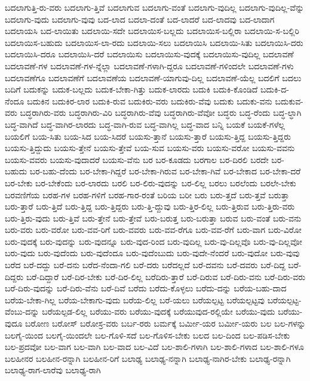 {ಬದಲಾಗುತ್ತಿ-ರು-ವರು
ಬದಲಾಗು-ತ್ತಿವೆ
ಬದಲಾಗುವ
ಬದಲಾಗು-ವಂತೆ
ಬದಲಾಗು-ವುದಿಲ್ಲ
ಬದಲಾಗು-ವುದಿಲ್ಲ-ವೆನ್ನು
ಬದಲಾಗು-ವುದು
ಬದಲಾಗು-ವುವು
ಬದ-ಲಾದ
ಬದಲಾ-ದಂತೆ
ಬದ-ಲಾದರೆ
ಬದ-ಲಾದವು
ಬದ-ಲಾದಾಗ
ಬದಲಾಯಸಿ
ಬದ-ಲಾಯಿತು
ಬದಲಾಯಿ-ಸದೇ
ಬದಲಾಯಿಸ-ಬಲ್ಲದು
ಬದಲಾಯಿಸ-ಬಲ್ಲಿರಾ
ಬದಲಾಯಿ-ಸ-ಬಲ್ಲಿರಿ
ಬದಲಾಯಿಸ-ಬಹುದು
ಬದಲಾಯಿಸ-ಲಾ-ರದು
ಬದಲಾಯಿ-ಸಲು
ಬದಲಾಯಿಸಿ
ಬದಲಾಯಿ-ಸಿತು
ಬದಲಾಯಿಸಿ-ದರು
ಬದಲಾಯಿಸಿ-ದರೂ
ಬದಲಾಯಿಸಿ-ದರೆ
ಬದಲಾಯಿಸು
ಬದಲಾಯಿಸು-ವುದಕ್ಕೆ
ಬದಲಾಯಿಸು-ವುದಿಲ್ಲ
ಬದಲಾವಣೆ
ಬದಲಾವಣೆ-ಗಳ
ಬದಲಾವಣೆ-ಗಳ-ನ್ನೆಲ್ಲಾ
ಬದಲಾವಣೆ-ಗಳಾಗಿ-ದ್ದರೂ
ಬದಲಾವಣೆ-ಗಳಿಂದಲೇ
ಬದಲಾವಣೆ-ಗಳು
ಬದಲಾವಣೆಗೂ
ಬದಲಾವಣೆಗೆ
ಬದಲಾವಣೆಯ
ಬದಲಾವಣೆ-ಯಾಗುವು-ದಿಲ್ಲ
ಬದಲಾವಣೆ-ಯೆಲ್ಲ
ಬದಲಿಗೆ
ಬದಲು
ಬದಿಗೆ
ಬದುಕನ್ನು
ಬದುಕ-ಬಲ್ಲದು
ಬದುಕ-ಬೇಕಾ-ಗಿತ್ತು
ಬದುಕ-ಲಾರದು
ಬದುಕಿ
ಬದುಕಿ-ಕೊಂಡಿದೆ
ಬದುಕಿ-ದ-ನೆಂದೂ
ಬದುಕಿನ
ಬದುಕಿರ-ಲಾರ
ಬದುಕಿ-ರುವ
ಬದುಕಿರು-ವರು
ಬದುಕಿರು-ವೆವು
ಬದುಕು
ಬದುಕು-ವನು
ಬದುಕುವ-ವರು
ಬದ್ಧರಾಗಿರು-ವರು
ಬದ್ಧರಾಗಿರು-ವಿರಿ
ಬದ್ಧರಾಗಿರು-ವೆವು
ಬದ್ಧರಾಗಿರು-ವೆವೋ
ಬದ್ಧರು
ಬದ್ಧ-ರೆಂದು
ಬದ್ಧ-ಲ್ಧಾಗಿ
ಬದ್ಧ-ವಾಗಿದೆ
ಬದ್ಧ-ವಾಗಿರ-ಲಾರದು
ಬದ್ಧ-ವಾಗಿ-ರುವ
ಬದ್ಧ-ವಾಗಿಲ್ಲ
ಬದ್ಧ-ವಾದ
ಬನ್ನಿ
ಬಯಕೆ
ಬಯಕೆ-ಗಳೆಲ್ಲ
ಬಯಲಿಗೆ
ಬಯ-ಸಿತು
ಬಯ-ಸಿದ
ಬಯ-ಸಿದರೆ
ಬಯಸು-ತ್ತಾನೆ
ಬಯಸು-ತ್ತಾರೆ
ಬಯಸು-ತ್ತಿದ್ದ
ಬಯಸು-ತ್ತಿದ್ದರು
ಬಯಸು-ತ್ತಿದ್ದುದು
ಬಯಸು-ತ್ತೇನೆ
ಬಯಸು-ತ್ತೇವೆ
ಬಯ-ಸುವ
ಬಯಸು-ವರು
ಬಯಸು-ವರೋ
ಬಯಸು-ವವನು
ಬಯಸು-ವವರು
ಬಯಸು-ವುದಾದರೆ
ಬಯಸು-ವೆನು
ಬರ
ಬರ-ಕೂಡದು
ಬರಗಾಲ
ಬರ-ದಿರಲಿ
ಬರದೇ
ಬರ-ಬಹುದು
ಬರ-ಬಹು-ದೆಂದು
ಬರ-ಬೇಕಾ-ಗಿದ್ದರೆ
ಬರ-ಬೇಕಾ-ಗಿರುವ
ಬರ-ಬೇಕಾ-ಗಿವೆ
ಬರ-ಬೇಕಾದ
ಬರ-ಬೇಕಾ-ದರೆ
ಬರ-ಬೇಕು
ಬರ-ಬೇಕೆಂದು
ಬರ-ಲಾರದು
ಬರಲಿ
ಬರ-ಲಿರು-ವುದನ್ನು
ಬರ-ಲಿಲ್ಲ
ಬರಲು
ಬರಲೆಂದು
ಬರಲೇ-ಬೇಕು
ಬರವಣಿಗೆಯ
ಬರಹ-ಗಳ
ಬರಹ-ಗಳಿಗೆ
ಬರಹ-ಗಾರ-ರಂತೆ
ಬರಿಯ
ಬರೀ
ಬರು
ಬರು-ತ್ತದೆ
ಬರು-ತ್ತವೆ
ಬರುತ್ತಾ
ಬರು-ತ್ತಾರೆ
ಬರು-ತ್ತಿದೆ
ಬರು-ತ್ತಿದ್ದ
ಬರು-ತ್ತಿದ್ದರು
ಬರು-ತ್ತಿ-ದ್ದುವು
ಬರು-ತ್ತಿರ-ಲಿಲ್ಲ
ಬರು-ತ್ತಿರುವ
ಬರು-ತ್ತಿರು-ವರು
ಬರು-ತ್ತಿರು-ವುದು
ಬರು-ತ್ತಿವೆ
ಬರು-ತ್ತೇನೆ
ಬರು-ತ್ತೇವೆ
ಬರು-ಬರುತ್ತ
ಬರು-ಬರುತ್ತಾ
ಬರುವ
ಬರು-ವಂತೆ
ಬರು-ವನು
ಬರು-ವರು
ಬರು-ವರೋ
ಬರು-ವವ-ರಿಗೆ
ಬರು-ವವರು
ಬರು-ವವ-ರೆಗೂ
ಬರು-ವವ-ರೆಗೆ
ಬರು-ವಾಗ
ಬರು-ವಿರೋ
ಬರು-ವುದಕ್ಕೆ
ಬರು-ವುದನ್ನು
ಬರು-ವುದನ್ನೂ
ಬರು-ವುದ-ರಿಂದ
ಬರು-ವುದಿಲ್ಲ
ಬರು-ವು-ದಿಲ್ಲವೊ
ಬರು-ವು-ದಿಲ್ಲವೋ
ಬರು-ವುದು
ಬರು-ವುದೆಂದು
ಬರು-ವುದೆಂದೂ
ಬರು-ವುದೆಂಬುದು
ಬರು-ವುದೇ-ನೆಂದರೆ
ಬರು-ವುದೋ
ಬರು-ವುವು
ಬರೆದ
ಬರೆ-ದದ್ದು
ಬರೆ-ದನು
ಬರೆದ-ನೆಂದಾ-ಗಲಿ
ಬರೆ-ದರು
ಬರೆದಲ್ಲದೆ
ಬರೆ-ದವನು
ಬರೆ-ದವರು
ಬರೆ-ದಿದ್ದ
ಬರೆ-ದಿದ್ದರು
ಬರೆ-ದಿದ್ದಾರೆ
ಬರೆ-ದಿರ-ಬೇಕು
ಬರೆ-ದಿರ-ಲಿಲ್ಲ
ಬರೆದಿರು-ತ್ತಾರೆ
ಬರೆ-ದಿರುವ
ಬರೆ-ದಿರು-ವನು
ಬರೆ-ದಿರು-ವರು
ಬರೆ-ದಿರು-ವುದನ್ನು
ಬರೆ-ದಿರು-ವೆನು
ಬರೆ-ದಿವೆ
ಬರೆದು
ಬರೆದು-ಕೊಳ್ಳಲು
ಬರೆದು-ದನ್ನು
ಬರೆಯ-ಬಹು-ದಾದ
ಬರೆಯ-ಬೇಕಾ-ಗಿಲ್ಲ
ಬರೆಯ-ಬೇಕಾಗು-ವುದು
ಬರೆಯ-ಲಿಲ್ಲ
ಬರೆ-ಯಲು
ಬರೆಯಲ್ಪಟ್ಟ
ಬರೆಯಲ್ಪಟ್ಟವು
ಬರೆಯಲ್ಪಟ್ಟ-ವೆಂಬು-ದನ್ನು
ಬರೆಯಲ್ಪಡ-ಲಿಲ್ಲ
ಬರೆಯು-ವರು
ಬರೆಯು-ವುದಕ್ಕೆ
ಬರೆಯುವುದ-ರಲ್ಲಿಯೇ
ಬರೆಯು-ವುದು
ಬರೆಯು-ವುದೂ
ಬರೋಣ
ಬರೋಸ್
ಬರೋಸ್ರ-ವರು
ಬರ್ಬ-ರರು
ಬರ್ಮಕ್ಕೆ
ಬರ್ಮೀ-ಯರ
ಬರ್ಮೀ-ಯರು
ಬಲ
ಬಲ-ಗಳನ್ನು
ಬಲಗೈ-ಯಿಂದ
ಬಲಗೈ-ಯಿಂದಲೇ
ಬಲ-ಗೊಳಿ-ಸದೆ
ಬಲ-ಗೊಳಿಸ-ಬೇಕು
ಬಲದ
ಬಲ-ದಿಂದ
ಬಲ-ಪಡಿಸ-ಬೇಕು
ಬಲ-ಪ್ರದವೋ
ಬಲ-ವಾಗ
ಬಲ-ವಾಗಿ
ಬಲ-ವಾದ
ಬಲ-ವಿದೆ
ಬಲ-ಶಾಲಿ-ಗಳಾಗಿ
ಬಲ-ಶಾಲಿ-ಗಳಾದ
ಬಲ-ಶಾಲಿ-ಗಳೂ
ಬಲಹೀನರ
ಬಲಹೀನ-ರನ್ನಾಗಿ
ಬಲಹೀನ-ರಿಗೆ
ಬಲಾಢ್ಯ
ಬಲಾಢ್ಯ-ನನ್ನಾಗಿ
ಬಲಾಢ್ಯ-ನಾಗಿರ-ಬೇಕು
ಬಲಾಢ್ಯ-ರನ್ನಾಗಿ
ಬಲಾಢ್ಯ-ರಾಗ-ಲಾರೆವು
ಬಲಾಢ್ಯ-ರಾಗಿ
}
